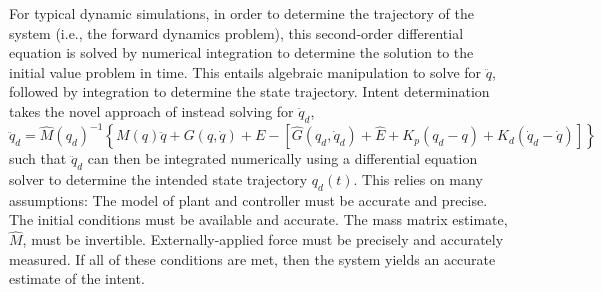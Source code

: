 For typical dynamic simulations, in order to determine the trajectory of the system (i.e., the forward dynamics problem), this second-order differential equation is solved by numerical integration to determine the solution to the initial value problem in time. This entails algebraic manipulation to solve for $\ddot{q}$, followed by integration to determine the state trajectory. Intent determination takes the novel approach of instead solving for $\ddot{q}_d$,
\begin{equation} \label{eq:solveDDQ}
\ddot{q}_d=\hat{M}(q_d)^{-1}\left\{M(q)\ddot{q}+G(q,\dot{q})+E-[\hat{G}(q_d,\dot{q}_d)+\hat{E}+K_p(q_d-q)+K_d(\dot{q}_d-\dot{q})]\right\}
\end{equation}  
such that $\ddot{q}_d$ can then be integrated numerically using a differential equation solver to determine the intended state trajectory $q_d(t)$. This relies on many assumptions: The model of plant and controller must be accurate and precise. The initial conditions must be available and accurate. The mass matrix estimate, $\hat{M}$, must be invertible. Externally-applied force must be precisely and accurately measured. If all of these conditions are met, then the system yields an accurate estimate of the intent.

